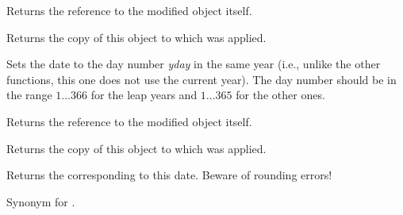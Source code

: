Returns the reference to the modified object itself.


\label{wxdatetimegetlastmonthday}


Returns the copy of this object to which
 was applied.


\label{wxdatetimesettoyearday}


Sets the date to the day number {\it yday} in the same year (i.e., unlike the
other functions, this one does not use the current year). The day number
should be in the range $1\ldots366$ for the leap years and $1\ldots365$ for
the other ones.

Returns the reference to the modified object itself.


\label{wxdatetimegetyearday}


Returns the copy of this object to which
 was applied.



\label{wxdatetimegetjuliandaynumber}


Returns the  corresponding to this date. Beware
of rounding errors!




\label{wxdatetimegetjdn}


Synonym for .


\label{wxdatetimegetmodifiedjuliandaynumber}


